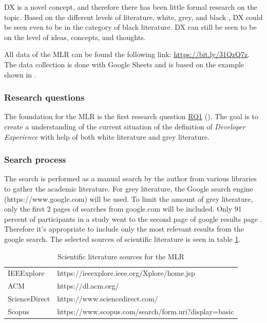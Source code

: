 \documentclass[english, 12pt, a4paper, sci, utf8, a-1b, online]{aaltothesis}
\newcounter{subsubsubsection}[subsubsection]
\begin{document}
DX is a novel concept, and therefore there has been little formal research on the topic. Based on the different levels of literature, white, grey, and black \citep{guidelines-for-MLR}, DX could be seen even to be in the category of black literature. DX can still be seen to be on the level of ideas, concepts, and thoughts.

\newcommand{\mlrdxlink}{https://bit.ly/31QzQ7z}

All data of the MLR can be found the following link: \href{\mlrdxlink}{https://bit.ly/31QzQ7z}. The data collection is done with Google Sheets and is based on the example shown in \citep{guidelines-for-MLR}.

\subsubsection{Research questions}

The foundation for the MLR is the first research question \hyperref[RQ1]{RQ1} (\rqone). The goal is to create a understanding of the current situation of the definition of \textit{Developer Experience} with help of both white literature and grey literature.

\subsubsection{Search process}


The search is performed as a manual search by the author from various libraries to gather the academic literature. For grey literature, the Google search engine (https://www.google.com) will be used. To limit the amount of grey literature, only the first 2 pages of searches from google.com will be included. Only 91 percent of participants in a study went to the second page of google results page \citep{google-search}. Therefore it's appropriate to include only the most relevant results from the google search. The selected sources of scientific literature is seen in table \ref{table:included-sources}.

\begin{table}
  \centering
  \begin{tabular}{ l l }
    \hline
    IEEExplore    & https://ieeexplore.ieee.org/Xplore/home.jsp          \\
    ACM           & https://dl.acm.org/                                  \\
    ScienceDirect & https://www.sciencedirect.com/                       \\
    Scopus        & https://www.scopus.com/search/form.uri?display=basic \\
    \hline
  \end{tabular}
  \caption{Scientific literature sources for the MLR}
  \label{table:included-sources}
\end{table}
\end{document}
